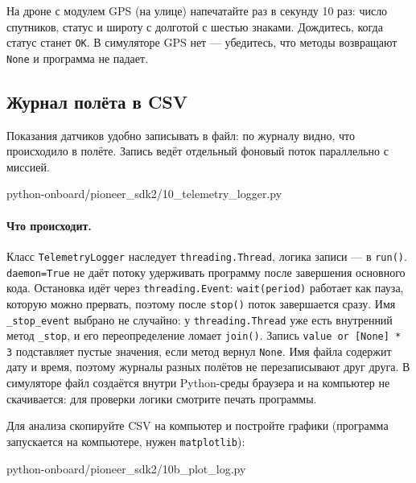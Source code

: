 \begin{taskbox}
На дроне с модулем GPS (на улице) напечатайте раз в секунду 10 раз: число спутников, статус и широту с долготой с шестью знаками. Дождитесь, когда статус станет \texttt{OK}. В симуляторе GPS нет --- убедитесь, что методы возвращают \verb|None| и программа не падает.
\end{taskbox}

\subsection{Журнал полёта в CSV}

Показания датчиков удобно записывать в файл: по журналу видно, что происходило в полёте. Запись ведёт отдельный фоновый поток параллельно с миссией.

\begin{codefile}[python]{python-onboard/pioneer_sdk2/10_telemetry_logger.py}
\end{codefile}

\paragraph{Что происходит.} Класс \verb|TelemetryLogger| наследует \verb|threading.Thread|, логика записи --- в \verb|run()|. \verb|daemon=True| не даёт потоку удерживать программу после завершения основного кода. Остановка идёт через \verb|threading.Event|: \verb|wait(period)| работает как пауза, которую можно прервать, поэтому после \verb|stop()| поток завершается сразу. Имя \verb|_stop_event| выбрано не случайно: у \verb|threading.Thread| уже есть внутренний метод \verb|_stop|, и его переопределение ломает \verb|join()|. Запись \verb|value or [None] * 3| подставляет пустые значения, если метод вернул \verb|None|. Имя файла содержит дату и время, поэтому журналы разных полётов не перезаписывают друг друга. В симуляторе файл создаётся внутри Python-среды браузера и на компьютер не скачивается: для проверки логики смотрите печать программы.

Для анализа скопируйте CSV на компьютер и постройте графики (программа запускается на компьютере, нужен \texttt{matplotlib}):

\begin{codefile}[python]{python-onboard/pioneer_sdk2/10b_plot_log.py}
\end{codefile}


